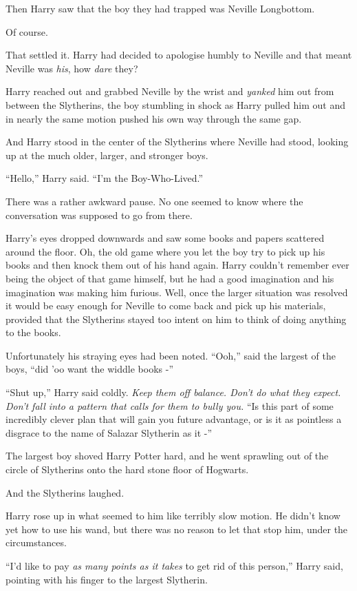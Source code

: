 Then Harry saw that the boy they had trapped was Neville Longbottom.

Of course.

That settled it. Harry had decided to apologise humbly to Neville and
that meant Neville was \emph{his}, how \emph{dare} they?

Harry reached out and grabbed Neville by the wrist and \emph{yanked} him
out from between the Slytherins, the boy stumbling in shock as Harry
pulled him out and in nearly the same motion pushed his own way through
the same gap.

And Harry stood in the center of the Slytherins where Neville had stood,
looking up at the much older, larger, and stronger boys.

``Hello,'' Harry said. ``I'm the Boy-Who-Lived.''

There was a rather awkward pause. No one seemed to know where the
conversation was supposed to go from there.

Harry's eyes dropped downwards and saw some books and papers scattered
around the floor. Oh, the old game where you let the boy try to pick up
his books and then knock them out of his hand again. Harry couldn't
remember ever being the object of that game himself, but he had a good
imagination and his imagination was making him furious. Well, once the
larger situation was resolved it would be easy enough for Neville to
come back and pick up his materials, provided that the Slytherins stayed
too intent on him to think of doing anything to the books.

Unfortunately his straying eyes had been noted. ``Ooh,'' said the
largest of the boys, ``did 'oo want the widdle books -''

``Shut up,'' Harry said coldly. \emph{Keep them off balance. Don't do
what they expect. Don't fall into a pattern that calls for them to bully
you.} ``Is this part of some incredibly clever plan that will gain you
future advantage, or is it as pointless a disgrace to the name of
Salazar Slytherin as it -''

The largest boy shoved Harry Potter hard, and he went sprawling out of
the circle of Slytherins onto the hard stone floor of Hogwarts.

And the Slytherins laughed.

Harry rose up in what seemed to him like terribly slow motion. He didn't
know yet how to use his wand, but there was no reason to let that stop
him, under the circumstances.

``I'd like to pay \emph{as many points as it takes} to get rid of this
person,'' Harry said, pointing with his finger to the largest Slytherin.

